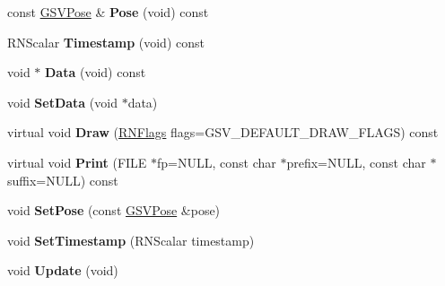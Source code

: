 \begin{DoxyCompactItemize}
\item 
const \hyperlink{class_g_s_v_pose}{G\+S\+V\+Pose} \& {\bfseries Pose} (void) const \hypertarget{class_g_s_v_column_ad7cdaad3abe301ec2c74ed082116a98d}{}\label{class_g_s_v_column_ad7cdaad3abe301ec2c74ed082116a98d}

\item 
R\+N\+Scalar {\bfseries Timestamp} (void) const \hypertarget{class_g_s_v_column_a7fef78a3ff5f62649dfec7e3e0fe1d40}{}\label{class_g_s_v_column_a7fef78a3ff5f62649dfec7e3e0fe1d40}

\item 
void $\ast$ {\bfseries Data} (void) const \hypertarget{class_g_s_v_column_adb89c5cb76f55eb7b28fa46661d5c1c0}{}\label{class_g_s_v_column_adb89c5cb76f55eb7b28fa46661d5c1c0}

\item 
void {\bfseries Set\+Data} (void $\ast$data)\hypertarget{class_g_s_v_column_ae5c73289455bbdb79628827ecbca6637}{}\label{class_g_s_v_column_ae5c73289455bbdb79628827ecbca6637}

\item 
virtual void {\bfseries Draw} (\hyperlink{class_r_n_flags}{R\+N\+Flags} flags=G\+S\+V\+\_\+\+D\+E\+F\+A\+U\+L\+T\+\_\+\+D\+R\+A\+W\+\_\+\+F\+L\+A\+GS) const \hypertarget{class_g_s_v_column_a36b1c89632dd7569bdc4ebea4ed7d3dc}{}\label{class_g_s_v_column_a36b1c89632dd7569bdc4ebea4ed7d3dc}

\item 
virtual void {\bfseries Print} (F\+I\+LE $\ast$fp=N\+U\+LL, const char $\ast$prefix=N\+U\+LL, const char $\ast$suffix=N\+U\+LL) const \hypertarget{class_g_s_v_column_aa2a096aa4deb53647190bd606b305cf5}{}\label{class_g_s_v_column_aa2a096aa4deb53647190bd606b305cf5}

\item 
void {\bfseries Set\+Pose} (const \hyperlink{class_g_s_v_pose}{G\+S\+V\+Pose} \&pose)\hypertarget{class_g_s_v_column_aa5e8020dc10a6a1ff21b5f5c978a6a80}{}\label{class_g_s_v_column_aa5e8020dc10a6a1ff21b5f5c978a6a80}

\item 
void {\bfseries Set\+Timestamp} (R\+N\+Scalar timestamp)\hypertarget{class_g_s_v_column_a4ff2a8bfc301ee3689d146d26f66a318}{}\label{class_g_s_v_column_a4ff2a8bfc301ee3689d146d26f66a318}

\item 
void {\bfseries Update} (void)\hypertarget{class_g_s_v_column_ac51636cd4ee5071778d5194e8a55a4cd}{}\label{class_g_s_v_column_ac51636cd4ee5071778d5194e8a55a4cd}

\end{DoxyCompactItemize}
